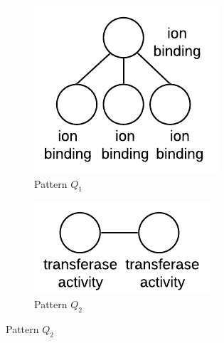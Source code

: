 %
\begin{figure}[tb!]
	\vspace{-0.20in}
	\centering
	\begin{subfigure}[b]{0.12\textwidth}
	\includegraphics[scale=0.5]{img_ex/func_1.pdf}
	\caption{Pattern $Q_1$}
		\label{fig:f1}
	\end{subfigure}%
	\begin{subfigure}[b]{0.30\textwidth}
		\hspace*{15mm}\includegraphics[scale=0.6]{img_ex/func_2.pdf}
		\caption{Pattern $Q_2$}
		\label{fig:f2}
	\end{subfigure}


\end{figure}
